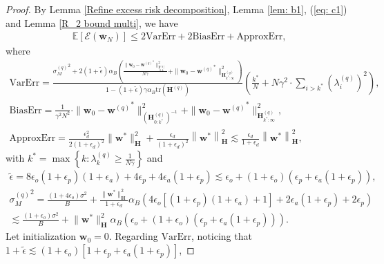 \documentclass[11pt, letterpaper]{article}
\begin{document}
\begin{proof}
    By Lemma \ref{Refine excess risk decomposition}, Lemma \ref{lem: b1}, (\ref{eq: c1}) and Lemma \ref{R_2 bound multi}, we have
    \begin{equation*}
        \begin{aligned}
            \mathbb{E}[\mathcal{E}(\overline{\mathbf{w}}_N)]\leq 2\mathrm{VarErr}+2\mathrm{BiasErr}+\mathrm{ApproxErr},
        \end{aligned}
    \end{equation*}
    where
    \begin{gather*}
        \mathrm{VarErr}=\frac{{\sigma_M^{(q)}}^2+2(1+\tilde{\epsilon})\alpha_B\left(\frac{\|\mathbf{w}_0-{\mathbf{w}^{(q)}}^*\|_{\mathbf{I}_{0:k^*}^{(q)}}^2}{N\gamma}+\|\mathbf{w}_0-{\mathbf{w}^{(q)}}^*\|_{\mathbf{H}_{k^*:\infty}^{(q)}}^2\right)}{1-(1+\tilde{\epsilon})\gamma\alpha_B\mathrm{tr}(\mathbf{H}^{(q)})}\left(\frac{k^*}{N}+N\gamma^2\cdot\sum_{i>k^*}(\lambda_i^{(q)})^2\right),\\
        \mathrm{BiasErr}=\frac{1}{\gamma^2N^2}\cdot\|\mathbf{w}_0-{\mathbf{w}^{(q)}}^*\|_{(\mathbf{H}_{0:k^*}^{(q)})^{-1}}^2+\|\mathbf{w}_0-{\mathbf{w}^{(q)}}^*\|_{\mathbf{H}_{k^*:\infty}^{(q)}}^2,\\
        \mathrm{ApproxErr}=\frac{\epsilon_d^2}{2(1+\epsilon_d)^2}\|\mathbf{w}^*\|_\mathbf{H}^2+\frac{\epsilon_d}{(1+\epsilon_d)^2}\left\|\mathbf{w}^*\right\|_\mathbf{H}^2\lesssim \frac{\epsilon_d}{1+\epsilon_d}\left\|\mathbf{w}^*\right\|_\mathbf{H}^2,
    \end{gather*}
    with $k^*=\max\left\{k: \lambda_k^{(q)} \geq \frac{1}{N\gamma}\right\}$ and
    \begin{gather*}
            \tilde{\epsilon}=8\epsilon_o(1+\epsilon_p)(1+\epsilon_a)+4\epsilon_p+4\epsilon_a(1+\epsilon_p)\lesssim \epsilon_o+(1+\epsilon_o)(\epsilon_p+\epsilon_a(1+\epsilon_p)),\\
            {\sigma_M^{(q)}}^2=\frac{(1+4\epsilon_o)\sigma^2}{B} + \frac{\|\mathbf{w}^*\|_\mathbf{H}^2}{1+\epsilon_d}\alpha_B\left(4\epsilon_o[(1+\epsilon_p)(1+\epsilon_a)+1]+2\epsilon_a(1+\epsilon_p)+2\epsilon_p \right)\\
            \lesssim \frac{(1+\epsilon_o)\sigma^2}{B} + {\|\mathbf{w}^*\|_\mathbf{H}^2}\alpha_B\left(\epsilon_o+(1+\epsilon_o)(\epsilon_p+\epsilon_a(1+\epsilon_p)) \right).
    \end{gather*}
    Let initialization $\mathbf{w}_0=0$. Regarding $\mathrm{VarErr}$, noticing that
    $1+\tilde{\epsilon}\lesssim (1+\epsilon_o)[1+\epsilon_p+\epsilon_a(1+\epsilon_p)]$,

\end{proof}
\end{document}
